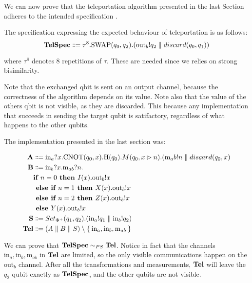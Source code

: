 \begin{example}
We can now prove that the teleportation algorithm presented in the last Section adheres to the intended specification .

 The specification expressing the expected behaviour of teleportation is as follows:
\[\text{\textbf{TelSpec}} \Coloneqq \tau^8.\text{SWAP}(q_0,q_2).(\text{out}_b!q_2 \parallel discard(q_0, q_1))\]

where $\tau^8$ denotes $8$ repetitions of $\tau$. These are needed since we relies on strong bisimilarity.

Note that the exchanged qbit is sent on an output channel, because the  correctness of the algorithm depends on its value. Note also that the value of the others qbit is not visible, as they are discarded. This because any implementation that succeeds in sending the target qubit is satifactory, regardless of what happens to the other qubits.

The implementation presented in the last section was: 

\begin{align*}
  \text{\textbf{A}} &\Coloneqq \text{in}_a?x.\text{CNOT}(q_0, x).\text{H}(q_0).M(q_0, x \rhd n).(\text{m}_ab!n \parallel discard(q_0, x)\\
  \text{\textbf{B}} &\Coloneqq \text{in}_b?x.\text{m}_{ab}?n.
     \\ & \textbf{if } n = 0 \textbf{ then } I(x).\text{out}_b!x\\& \textbf{ else } \textbf{if } n = 1 \textbf{ then } X(x).\text{out}_b!x\\& \textbf{ else } \textbf{if } n = 2 \textbf{ then } Z(x).\text{out}_b!x\\& \textbf{ else } Y(x).\text{out}_b!x
   \\
  \text{\textbf{S}} &\Coloneqq Set_{\Phi^+}(q_1, q_2).(\text{in}_a!q_1 \parallel \text{in}_b!q_2) \\
  \text{\textbf{Tel}} &\Coloneqq (A \parallel B \parallel S) \setminus \Set{\text{in}_a, \text{in}_b, \text{m}_{ab} }
\end{align*}

We can prove that $\text{\textbf{TelSpec}} \sim_{PS} \text{\textbf{Tel}}$. Notice in fact that the channels $\text{in}_a, \text{in}_b, \text{m}_{ab}$ in $\text{\textbf{Tel}}$ are limited, so the only visible communications happen on the $\text{out}_b$ channel. After all the transformations and measurements, $\text{\textbf{Tel}}$ will leave the $q_2$ qubit exactly as $\text{\textbf{TelSpec}}$, and the other qubits are not visible.
\end{example}

